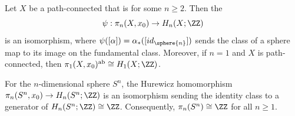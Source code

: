 \begin{theorem} \label{theorem:hurewicz}
Let $X$ be a path-connected  that is  for some $n \geq 2$. Then the 
\[
\psi: \pi_n(X,x_0) \to H_n(X;\ZZ)
\]
is an isomorphism, where $\psi([\alpha]) = \alpha_*([id_{\sphere{n}}])$ sends the class of a sphere map to its image on the fundamental class. Moreover, if $n = 1$ and $X$ is path-connected, then $\pi_1(X,x_0)^{\mathrm{ab}} \cong H_1(X;\ZZ)$.
\end{theorem}

\begin{corollary} \label{corollary:hurewicz_for_spheres_and_products}
For the $n$-dimensional sphere $S^n$, the Hurewicz homomorphism $\pi_n(S^n,x_0) \to H_n(S^n;\ZZ)$ is an isomorphism sending the identity class to a generator of $H_n(S^n;\ZZ) \cong \ZZ$. Consequently, $\pi_n(S^n) \cong \ZZ$ for all $n \geq 1$.
\end{corollary}
